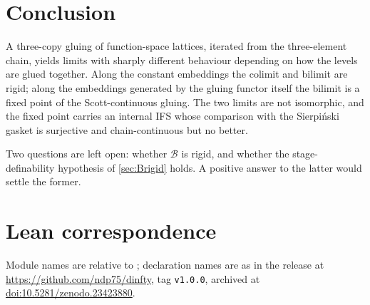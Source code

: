 \documentclass[11pt]{amsart}
\newcommand{\repourl}{https://github.com/ndp75/dinfty}
\newcommand{\repotag}{v1.0.0}
\newcommand{\repodoi}{10.5281/zenodo.23423880}
\theoremstyle{plain}
\theoremstyle{definition}
\newcommand{\BB}{\mathcal{B}}
\begin{document}
\section{Conclusion}

A three-copy gluing of function-space lattices, iterated from the three-element
chain, yields limits with sharply different behaviour depending on how the
levels are glued together. Along the constant embeddings the colimit and bilimit
are rigid; along the embeddings generated by the gluing functor itself the
bilimit is a fixed point of the Scott-continuous gluing. The two limits are not
isomorphic, and the fixed point carries an internal IFS whose comparison with the
Sierpi\'nski gasket is surjective and chain-continuous but no better.

Two questions are left open: whether $\BB$ is rigid, and whether the
stage-definability hypothesis of \cref{sec:Brigid} holds. A positive answer to
the latter would settle the former.

\appendix
\section{Lean correspondence}\label{app:lean}

Module names are relative to ; declaration names are as in the
release at \url{\repourl}, tag \texttt{\repotag}, archived at
\href{https://doi.org/\repodoi}{doi:\repodoi}.
\end{document}
